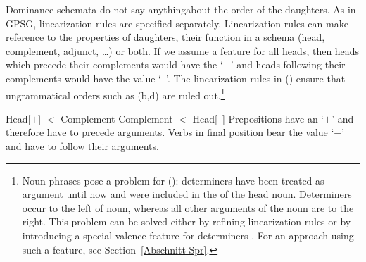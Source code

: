 \addlines
Dominance schemata do not say anything\indexgpsg about the order of the daughters. As in GPSG, linearization rules are specified separately.
Linearization rules can make reference to the properties of daughters, their function in a schema (head, complement,
adjunct, \ldots) or both.
If we assume a feature \initial{} for all heads, then heads which precede their complements would have the \initialv `$+$' and heads following their
  complements would have the value `--'. The linearization rules in () ensure that ungrammatical orders such as (b,d) are
  ruled out.\footnote{%
  Noun phrases pose a problem for (): determiners have been treated as argument until now and were included in the \compsl of the
  head noun. Determiners occur to the left of noun, whereas all other arguments of the noun are to the right. This problem can be solved either
  by refining linearization rules \citep[--165]{Mueller99a} or by introducing a special valence feature for determiners
  \citep[Section~9.4]{ps2}. For an approach using such a
  feature, see Section~\ref{Abschnitt-Spr}.%
}

\eal
\ex\label{lp-ini-arg} 
Head[\initial$+$] $<$ Complement
\ex 
Complement $<$ Head[\initial --]
\zl
Prepositions have an \initialv `$+$' and therefore have to precede arguments. Verbs in final position bear the value `$-$' and have to follow
their arguments.
\eal
{}
\ex[*]{
\gll {}[[den Schrank] in]\\
     \hspaceThis{[[}the cupboard in\\
}
\zl

